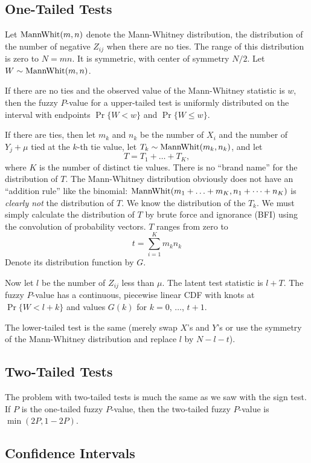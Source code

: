 \documentclass{article}
\newcommand{\MannWhitneyDis}{\text{\upshape MannWhit}}
\begin{document}
\subsection{One-Tailed Tests}

Let $\MannWhitneyDis(m, n)$ denote the Mann-Whitney distribution,
the distribution
of the number of negative $Z_{i j}$ when there are no ties.  The range of
this distribution is zero to $N = m n$.  It is symmetric, with center of
symmetry $N / 2$.  Let $W \sim \MannWhitneyDis(m, n)$.

If there are no ties and the observed value of the Mann-Whitney statistic
is $w$, then the fuzzy $P$-value for a upper-tailed test is uniformly
distributed on the interval with endpoints $\Pr\{ W < w \}$
and $\Pr \{ W \le w \}$.

If there are ties, then let $m_k$ and $n_k$ be the number of $X_i$ and the
number of $Y_j + \mu$ tied at the $k$-th tie value,
let $T_k \sim \MannWhitneyDis(m_k, n_k)$,
and let
$$
   T = T_1 + \ldots + T_K,
$$
where $K$ is the number of distinct tie values.  There is no ``brand name''
for the distribution of $T$.  The Mann-Whitney distribution obviously does
not have an ``addition rule'' like the binomial:
$\MannWhitneyDis(m_1 + \ldots + m_K, n_1 + \cdots + n_K)$ is \emph{clearly not}
the distribution of $T$.  We know the distribution of the $T_k$.
We must simply calculate the distribution of $T$ by brute force and ignorance
(BFI) using the convolution of probability vectors.
$T$ ranges from zero to
$$
   t = \sum_{i = 1}^K m_k n_k
$$
Denote its distribution function by $G$.

Now let $l$ be the number of $Z_{i j}$ less than $\mu$.  The latent test
statistic is $l + T$.  The fuzzy $P$-value has a continuous, piecewise linear
CDF with knots at $\Pr\{ W < l + k \}$ and values $G(k)$
for $k = 0$, $\ldots$, $t + 1$.

The lower-tailed test is the same (merely swap $X$'s and $Y$'s or use the
symmetry of the Mann-Whitney distribution and replace $l$ by $N - l - t$).

\subsection{Two-Tailed Tests}

The problem with two-tailed tests is much the same as we saw with the
sign test.  If $P$ is the one-tailed
fuzzy $P$-value, then the two-tailed
fuzzy $P$-value is $\min(2 P, 1 - 2 P)$.

\subsection{Confidence Intervals}
\end{document}
